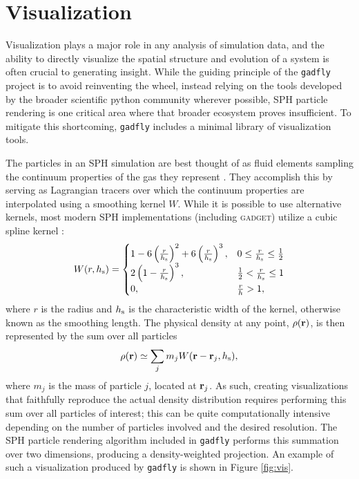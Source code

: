 \documentclass{emulateapj}
\newcommand{\code}[1]{\texttt{#1}}
\begin{document}
\section{Visualization}
\label{sec:vis}
Visualization plays a major role in any analysis of simulation data, and the ability to directly visualize the spatial structure and evolution of a system is often crucial to generating insight.
While the guiding principle of the \code{gadfly} project is to avoid reinventing the wheel, instead relying on the tools developed by the broader scientific python community wherever possible, SPH particle rendering is one critical area where that broader ecosystem proves insufficient.  
To mitigate this shortcoming, \code{gadfly} includes a minimal library of visualization tools.

The particles in an SPH simulation are best thought of as fluid elements sampling the continuum properties of the gas they represent \citep{Lucy1977,GingoldMonaghan1977,Monaghan1992,Springel2010}.  They accomplish this by serving as Lagrangian tracers over which the continuum properties are interpolated using a smoothing kernel $W$. While it is possible to use alternative kernels, most modern SPH implementations (including \textsc{gadget}) utilize a cubic spline kernel \citep{Springel2014}: 
\begin{equation}
W(r,h_{\rm s}) =
     \begin{cases}
       1 - 6 \left( \frac{r}{h_{\rm s}} \right)^2 + 6 \left( \frac{r}{h_{\rm s}} \right)^3, & 0 \leq \frac{r}{h_{\rm s}} \leq \frac{1}{2}\\
       2 \left(1 - \frac{r}{h_{\rm s}}\right)^3, & \frac{1}{2} < \frac{r}{h_{\rm s}} \leq 1\\
       0, & \frac{r}{h} >  1,\\
     \end{cases}
\end{equation}
where $r$ is the radius and $h_{\rm s}$ is the characteristic width of the kernel, otherwise known as the smoothing length.  The physical density at any point, $\rho(\bf{r})$, is then represented by the sum over all particles
\begin{equation}
\rho({\bf r}) \simeq \sum_j m_j W({\bf r} - {\bf r}_j, h_{\rm s}),
\end{equation}
where $m_j$ is the mass of particle $j$, located at ${\bf r}_j$.
As such, creating visualizations that faithfully reproduce the actual density distribution requires performing this sum over all particles of interest; this can be quite computationally intensive depending on the number of particles involved and the desired resolution.
The SPH particle rendering algorithm included in \code{gadfly} performs this summation over two dimensions, producing a density-weighted projection. An example of such a visualization produced by \code{gadfly} is shown in Figure \ref{fig:vis}.
\end{document}
